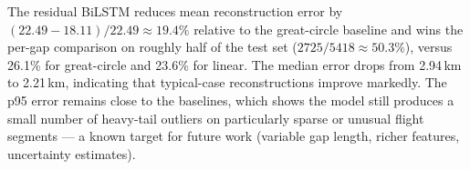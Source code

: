 \documentclass[11pt]{article}
\begin{document}
The residual BiLSTM reduces mean reconstruction error by $(22.49-18.11)/22.49 \approx \mathbf{19.4\%}$ relative to the great-circle baseline and wins the per-gap comparison on roughly half of the test set (\(2725/5418 \approx 50.3\%\)), versus 26.1\% for great-circle and 23.6\% for linear. The median error drops from 2.94\,km to 2.21\,km, indicating that typical-case reconstructions improve markedly. The p95 error remains close to the baselines, which shows the model still produces a small number of heavy-tail outliers on particularly sparse or unusual flight segments --- a known target for future work (variable gap length, richer features, uncertainty estimates).
\end{document}
